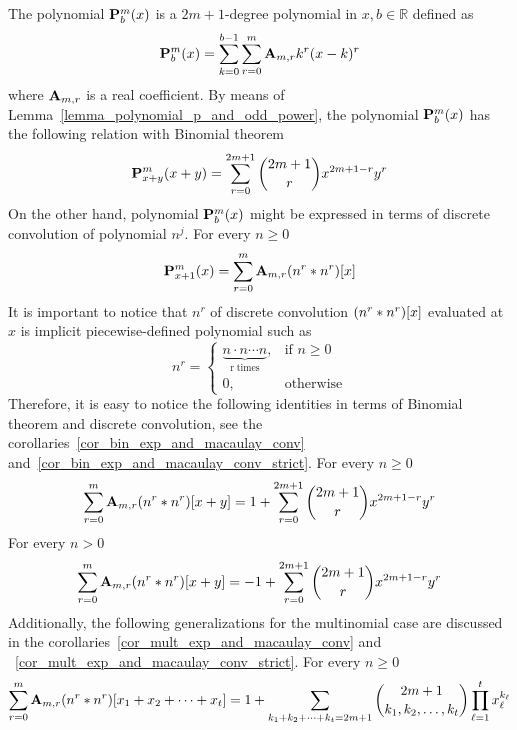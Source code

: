 The polynomial $\polynomialP{m}{b}{x}$ is a $2m+1$-degree polynomial in $x,b\in\mathbb{R}$ defined as
\begin{align*}
    \polynomialP{m}{b}{x} = \sum_{k=0}^{b-1} \sum_{r=0}^{m} \coeffA{m}{r} k^r(x-k)^r
\end{align*}
where $\coeffA{m}{r}$ is a real coefficient.
By means of Lemma~\eqref{lemma_polynomial_p_and_odd_power},
the polynomial $\polynomialP{m}{b}{x}$ has the following relation with Binomial theorem~\cite{AbraSteg72}
\begin{align*}
    \polynomialP{m}{x+y}{x+y} = \sum_{r=0}^{2m+1} \binom{2m+1}{r} x^{2m+1-r} y^r
\end{align*}
On the other hand, polynomial $\polynomialP{m}{b}{x}$ might be expressed in terms of discrete convolution
of polynomial $n^j$.
For every $n\geq 0$
\begin{align*}
    \polynomialP{m}{x+1}{x} = \sum_{r=0}^{m} \coeffA{m}{r} \convPower{n}{r}{x}
\end{align*}
It is important to notice that  $n^r$ of discrete convolution $\convPower{n}{r}{x}$ evaluated at $x$
is implicit piecewise-defined polynomial such as
\begin{equation*}
    n^{r} =
    \begin{cases}
        \underbrace{n \cdot n \cdots n}_{\mathrm{r \; times}}, & \mbox{if } n \geq 0 \\
        0, & \mbox{otherwise}
    \end{cases}
\end{equation*}
Therefore, it is easy to notice the following identities in terms of Binomial theorem and discrete convolution,
see the corollaries~\eqref{cor_bin_exp_and_macaulay_conv} and~\eqref{cor_bin_exp_and_macaulay_conv_strict}.
For every $n \geq 0$
\begin{equation*}
    \sum_{r=0}^{m} \coeffA{m}{r} \convPower{n}{r}{x+y}
    = 1 + \sum_{r=0}^{2m+1} \binom{2m+1}{r} x^{2m+1-r} y^r
\end{equation*}
For every $n > 0$
\begin{equation*}
    \sum_{r=0}^{m} \coeffA{m}{r} \convPower{n}{r}{x+y}
    = -1 + \sum_{r=0}^{2m+1} \binom{2m+1}{r} x^{2m+1-r} y^r
\end{equation*}
Additionally, the following generalizations for the multinomial case are discussed in
the corollaries~\eqref{cor_mult_exp_and_macaulay_conv} and ~\eqref{cor_mult_exp_and_macaulay_conv_strict}.
For every $n \geq 0$
\begin{align*}
    \sum_{r=0}^{m} \coeffA{m}{r} \convPower{n}{r}{\multifoldSum{t}} =
    1 + \sum_{\multifoldSum[k]{t}=2m+1} \binom{2m+1}{k_1, k_2,\ldots, k_t} \prod_{\ell=1}^{t} x_\ell^{k_\ell}
\end{align*}
